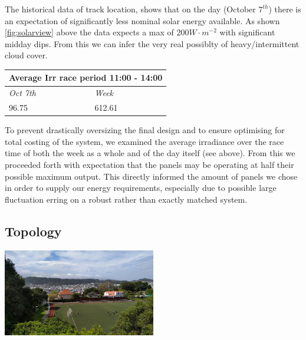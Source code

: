 \documentclass[11pt]{article}
\begin{document}
The historical data of track location, shows that on the day (October $7^{th}$) there is an expectation of significantly less nominal solar energy available. As shown \ref{fig:solarview} above the data expects a max of $200 W{\cdot}m^{-2}$ with significant midday dips. From this we can infer the very real possiblty of heavy/intermittent cloud cover.

\begin{table}[h!]
    \begin{center}
        \begin{tabular}{|l|l|}
            \hline
            \multicolumn{2}{|c|}{\textbf{Average Irr race period 11:00 - 14:00}} \\ \hline
            \textit{Oct 7th}                   & \textit{Week}                   \\ \hline
            96.75                              & 612.61                          \\ \hline
        \end{tabular}
    \end{center}
\end{table}

To prevent drastically oversizing the final design and to ensure optimising for total costing of the system, we examined the average irradiance over the race time of both the week as a whole and of the day itself (see above). From this we proceeded forth with expectation that the panels may be operating at half their possible maximum output. This directly informed the amount of panels we chose in order to supply our energy requirements, especially due to possible large fluctuation erring on a robust rather than exactly matched system.

\subsection{Topology}

\begin{center}
    \includegraphics[width=0.5\textwidth]{inc/IMG20201006120746.jpg}
\end{center}
\end{document}
